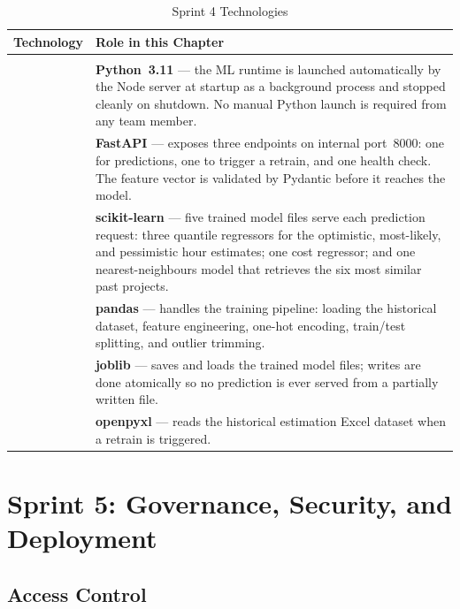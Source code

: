 \documentclass[12pt,a4paper]{report}
\newcommand{\logoplace}[1]{%
  \begin{tikzpicture}[baseline=-0.5ex]
    \node[fill=logobg, draw=logoborder, rounded corners=4pt,
          inner xsep=6pt, inner ysep=4pt,
          minimum width=2.4cm, minimum height=0.75cm,
          font=\bfseries\footnotesize\color{accentgray}] {#1};
  \end{tikzpicture}%
}
\newenvironment{techtable}[2]{%
  \begin{longtable}{>{\centering\arraybackslash}p{2.6cm} p{11cm}}
  \caption{#1}\label{#2}\\
  \toprule\textbf{Technology} & \textbf{Role in this Chapter}\\\midrule\endhead
  \midrule\multicolumn{2}{r}{\small\itshape Continued\ldots}\\\endfoot
  \bottomrule\endlastfoot
}{%
  \end{longtable}%
}
\begin{document}
\begin{techtable}{Sprint 4 Technologies}{tab:tech-sprint4}

  \logoplace{Python 3.11} &
  \textbf{Python~3.11} --- the ML runtime is launched automatically by the Node
  server at startup as a background process and stopped cleanly on shutdown. No
  manual Python launch is required from any team member.\\[6pt]

  \logoplace{FastAPI} &
  \textbf{FastAPI} --- exposes three endpoints on internal port~8000: one for
  predictions, one to trigger a retrain, and one health check. The feature vector
  is validated by Pydantic before it reaches the model.\\[6pt]

  \logoplace{scikit-learn} &
  \textbf{scikit-learn} --- five trained model files serve each prediction request:
  three quantile regressors for the optimistic, most-likely, and pessimistic hour
  estimates; one cost regressor; and one nearest-neighbours model that retrieves
  the six most similar past projects.\\[6pt]

  \logoplace{pandas} &
  \textbf{pandas} --- handles the training pipeline: loading the historical dataset,
  feature engineering, one-hot encoding, train/test splitting, and outlier trimming.\\[6pt]

  \logoplace{joblib} &
  \textbf{joblib} --- saves and loads the trained model files; writes are done
  atomically so no prediction is ever served from a partially written file.\\[6pt]

  \logoplace{openpyxl} &
  \textbf{openpyxl} --- reads the historical estimation Excel dataset when a retrain
  is triggered.\\

\end{techtable}

\chapter{Sprint 5: Governance, Security, and Deployment}

\section{Access Control}
\end{document}
